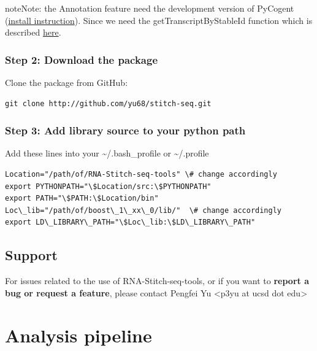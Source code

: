 \documentclass[letterpaper,10pt,english]{sphinxmanual}
\begin{document}
\begin{notice}{note}{Note:}
the Annotation feature need the development version of PyCogent (\href{http://pycogent.org/install.html\#to-use-the-development-version-of-pycogent}{install instruction}). Since we need the getTranscriptByStableId function which is described \href{https://github.com/pycogent/pycogent/issues/21}{here}.
\end{notice}


\subsection{Step 2: Download the package}
\label{Stitch-seq-tools:step-2-download-the-package}
Clone the package from GitHub:

\begin{Verbatim}[commandchars=\\\{\}]
git clone http://github.com/yu68/stitch-seq.git
\end{Verbatim}


\subsection{Step 3: Add library source to your python path}
\label{Stitch-seq-tools:step-3-add-library-source-to-your-python-path}
Add these lines into your \textasciitilde{}/.bash\_profile or \textasciitilde{}/.profile

\begin{Verbatim}[commandchars=\\\{\}]
Location="/path/of/RNA-Stitch-seq-tools" \# change accordingly
export PYTHONPATH="\$Location/src:\$PYTHONPATH"
export PATH="\$PATH:\$Location/bin"
Loc\_lib="/path/of/boost\_1\_xx\_0/lib/"  \# change accordingly
export LD\_LIBRARY\_PATH="\$Loc\_lib:\$LD\_LIBRARY\_PATH"
\end{Verbatim}


\section{Support}
\label{Stitch-seq-tools:support}
For issues related to the use of RNA-Stitch-seq-tools, or if you want to \textbf{report a bug or request a feature}, please contact Pengfei Yu \textless{}p3yu at ucsd dot edu\textgreater{}


\chapter{Analysis pipeline}
\label{Analysis_pipeline:analysis-pipeline}\label{Analysis_pipeline::doc}
\end{document}
